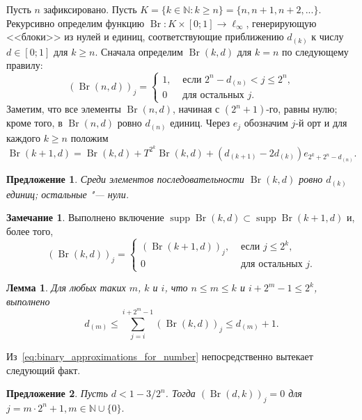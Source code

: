 \documentclass{article}
\theoremstyle{plain}
\newtheorem{lemma}{Лемма}
\newtheorem{proposition}{Предложение}
\theoremstyle{definition}
\newtheorem{remark}{Замечание}
\begin{document}
\begin{fulltext}
Пусть $n$ зафиксировано.
Пусть
$
	K = \{k\in\mathbb{N} : k \geq n\} = \{n, n+1, n+2, ...\}
	.
$
%
Рекурсивно определим функцию $\operatorname{Br}:K\times [0;1] \to \ell_\infty$,
генерирующую <<блоки>> из нулей и единиц,
соответствующие приближению $d_{(k)}$ к числу $d\in[0;1]$ для $k \geq n$.
Сначала определим $\operatorname{Br}(k,d)$ для $k=n$ по следующему правилу:
\begin{equation}
	(\operatorname{Br}(n,d))_j = \begin{cases}
		1, & \mbox{~если~} 2^n - d_{(n)} < j \leq 2^n,
		\\
		0  & \mbox{~для остальных~} j
		.
	\end{cases}
\end{equation}
Заметим, что все элементы $\operatorname{Br}(n,d)$, начиная с $(2^n+1)$-го, равны нулю;
кроме того, в $\operatorname{Br}(n,d)$ ровно $d_{(n)}$ единиц.
%
Через $e_j$ обозначим $j$-й орт и
для каждого $k \geq n$ положим
\begin{equation}
	\label{eq:Br(k+1,d)}
	\operatorname{Br}(k+1,d) = \operatorname{Br}(k,d) + T^{2^k}\operatorname{Br}(k,d) + (d_{(k+1)}-2d_{(k)})e_{2^k+2^n-d_{(n)}}
	.
\end{equation}
%
\begin{proposition}
	\label{prop:Br_k_c_0_1}
	Среди элементов последовательности $\operatorname{Br}(k,d)$ ровно $d_{(k)}$ единиц;
	остальные "--- нули.
\end{proposition}
%
\begin{remark}
	Выполнено включение $\operatorname{supp}\operatorname{Br}(k,d) \subset \operatorname{supp}\operatorname{Br}(k+1,d)$
	и, более того,
	\begin{equation}
		(\operatorname{Br}(k,d))_j = \begin{cases}
			(\operatorname{Br}(k+1,d))_j, & \mbox{~если~}  j \leq 2^k,
			\\
			0  & \mbox{~для остальных~} j
			.
		\end{cases}
	\end{equation}
\end{remark}
%
\begin{lemma}
	\label{lem:sum_Br_k_c}
	Для любых таких $m$, $k$ и $i$, что $n \leq m \leq k$ и  $ i + 2^m - 1 \leq 2^k$,
	выполнено
	\begin{equation}
		d_{(m)} \leq \sum_{j=i}^{i+2^m-1} (\operatorname{Br}(k,d))_j \leq d_{(m)}+1
		.
	\end{equation}
\end{lemma}
%
Из~\eqref{eq:binary_approximations_for_number} непосредственно вытекает следующий факт.
\begin{proposition}
	\label{prop:Br_has_nulls}
	Пусть $d<1-3/2^n$.
	Тогда
	$%
		(\operatorname{Br}(d,k))_j = 0 $ для $j = m\cdot 2^n + 1, m\in\mathbb{N} \cup\{0\}
		.
	$%
\end{proposition}


\end{fulltext}
\end{document}
